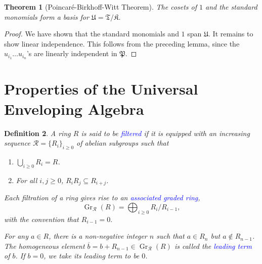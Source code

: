 \documentclass[12pt]{article}
\theoremstyle{thmstyle}
\newtheorem{theorem}{Theorem}[section]
\theoremstyle{defstyle}
\newtheorem{definition}[theorem]{Definition}
\newcommand{\frakT}{\mathfrak{T}}
\newcommand{\frakK}{\mathfrak{K}}
\newcommand{\frakP}{\mathfrak{P}} %
\newcommand{\frakU}{\mathfrak{U}}
\newcommand{\Gr}{\operatorname{Gr}}
\newcommand{\define}[1]{\textcolor{blue}{\textit{#1}}}
\renewcommand{\ge}{\geqslant}
\begin{document}
\begin{theorem}[Poincar\'e-Birkhoff-Witt Theorem]
    The cosets of $1$ and the standard monomials form a basis for $\frakU = \frakT/\frakK$.
\end{theorem}
\begin{proof}
    We have shown that the standard monomials and $1$ span $\frakU$. It remains to show linear independence. This follows from the preceding lemma, since the $u_{i_1}\dots u_{i_n}$'s are linearly independent in $\frakP$.
\end{proof}

\section{Properties of the Universal Enveloping Algebra}

\begin{definition}
    A ring $R$ is said to be \define{filtered} if it is equipped with an increasing sequence $\mathscr R = \{R_i\}_{i\ge 0}$ of abelian subgroups such that 
    \begin{enumerate}[label=(\alph*)]
        \item $\displaystyle\bigcup_{i\ge 0} R_i = R$. 
        \item For all $i,j\ge 0$, $R_iR_j\subseteq R_{i + j}$.
    \end{enumerate}

    Each filtration of a ring gives rise to an \define{associated graded ring}, 
    \begin{equation*}
        \Gr_{\mathscr R}(R) = \bigoplus_{i\ge 0} R_i/R_{i - 1},
    \end{equation*}
    with the convention that $R_{i - 1} = 0.$

    For any $a\in R$, there is a non-negative integer $n$ such that $a\in R_n$ but $a\notin R_{n - 1}$. The homogeneous element $\overline b = b + R_{n - 1}\in\Gr_{\mathscr R}(R)$ is called the \define{leading term} of $b$. If $b = 0$, we take its leading term to be $0$.
\end{definition}
\end{document}
